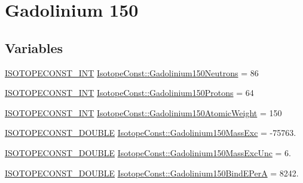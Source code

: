 \hypertarget{group___isotope_const-_gadolinium-_gd150}{}\section{Gadolinium 150}
\label{group___isotope_const-_gadolinium-_gd150}
\subsection*{Variables}
\begin{DoxyCompactItemize}
\item 
\mbox{\hyperlink{group___isotope_const-_macros_ga5f18360b3e99483a35c32d789e62621c}{I\+S\+O\+T\+O\+P\+E\+C\+O\+N\+S\+T\+\_\+\+I\+NT}} \mbox{\hyperlink{group___isotope_const-_gadolinium-_gd150_gab200d3a14f9fd4317a6c1e216420a6b3}{Isotope\+Const\+::\+Gadolinium150\+Neutrons}} = 86
\item 
\mbox{\hyperlink{group___isotope_const-_macros_ga5f18360b3e99483a35c32d789e62621c}{I\+S\+O\+T\+O\+P\+E\+C\+O\+N\+S\+T\+\_\+\+I\+NT}} \mbox{\hyperlink{group___isotope_const-_gadolinium-_gd150_ga640882c685ff120367408436033e5a53}{Isotope\+Const\+::\+Gadolinium150\+Protons}} = 64
\item 
\mbox{\hyperlink{group___isotope_const-_macros_ga5f18360b3e99483a35c32d789e62621c}{I\+S\+O\+T\+O\+P\+E\+C\+O\+N\+S\+T\+\_\+\+I\+NT}} \mbox{\hyperlink{group___isotope_const-_gadolinium-_gd150_gaede79bebad4f95819f58705584b88fb0}{Isotope\+Const\+::\+Gadolinium150\+Atomic\+Weight}} = 150
\item 
\mbox{\hyperlink{group___isotope_const-_macros_ga8f45a7272ce02c0b4c65c44636ed719a}{I\+S\+O\+T\+O\+P\+E\+C\+O\+N\+S\+T\+\_\+\+D\+O\+U\+B\+LE}} \mbox{\hyperlink{group___isotope_const-_gadolinium-_gd150_gac01f3c663c9cbc81546d7ca9b9bd9caa}{Isotope\+Const\+::\+Gadolinium150\+Mass\+Exc}} = -\/75763.
\item 
\mbox{\hyperlink{group___isotope_const-_macros_ga8f45a7272ce02c0b4c65c44636ed719a}{I\+S\+O\+T\+O\+P\+E\+C\+O\+N\+S\+T\+\_\+\+D\+O\+U\+B\+LE}} \mbox{\hyperlink{group___isotope_const-_gadolinium-_gd150_ga01a3fe375e8dc5fc907fed6a22ec7c18}{Isotope\+Const\+::\+Gadolinium150\+Mass\+Exc\+Unc}} = 6.
\item 
\mbox{\hyperlink{group___isotope_const-_macros_ga8f45a7272ce02c0b4c65c44636ed719a}{I\+S\+O\+T\+O\+P\+E\+C\+O\+N\+S\+T\+\_\+\+D\+O\+U\+B\+LE}} \mbox{\hyperlink{group___isotope_const-_gadolinium-_gd150_ga14cd5354d38a209c1abfa74ce0e9b503}{Isotope\+Const\+::\+Gadolinium150\+Bind\+E\+PerA}} = 8242.

\end{DoxyCompactItemize}
